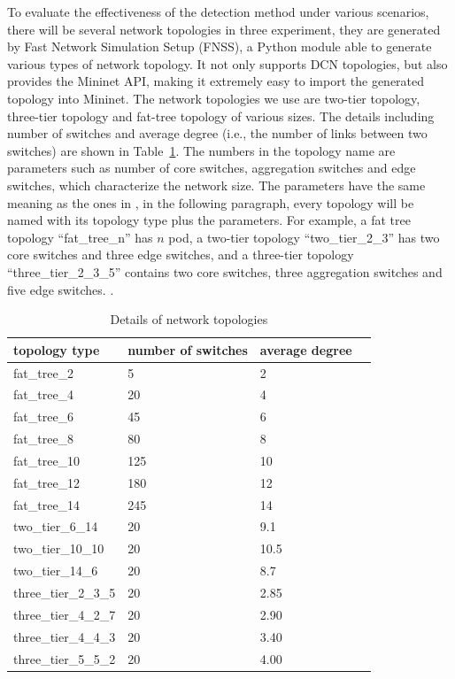 To evaluate the effectiveness of the detection method under various scenarios, there will be several network topologies in three experiment, they are generated by Fast Network Simulation Setup (FNSS), a Python module able to generate various types of network topology. It not only supports DCN topologies, but also provides the Mininet API, making it extremely easy to import the generated topology into Mininet. The network topologies we use are two-tier topology, three-tier topology and fat-tree topology of various sizes. The details including number of switches and average degree (i.e., the number of links between two switches) are shown in Table~\ref{table:network_env}. The numbers in the topology name are parameters such as number of core switches, aggregation switches and edge switches, which characterize the network size. The parameters have the same meaning as the ones in \cite{FNSS}, in the following paragraph, every topology will be named with its topology type plus the parameters. For example, a fat tree topology ``fat\_tree\_n'' has $n$ pod, a two-tier topology ``two\_tier\_2\_3'' has two core switches and three edge switches, and a three-tier topology ``three\_tier\_2\_3\_5'' contains two core switches, three aggregation switches and five edge switches.
\sout{}.

\begin{table}[H]
\centering
\caption{Details of network topologies}
\begin{tabular}{|l|l|l|l|}
\hline topology type & number of switches & average degree \\
\hline
\hline fat\_tree\_2 & 5 & 2 \\
\hline fat\_tree\_4 & 20 & 4 \\
\hline fat\_tree\_6 & 45 & 6 \\
\hline fat\_tree\_8 & 80 & 8 \\
\hline fat\_tree\_10 & 125 & 10 \\
\hline fat\_tree\_12 & 180 & 12 \\
\hline fat\_tree\_14 & 245 & 14 \\
\hline two\_tier\_6\_14 & 20 & 9.1 \\
\hline two\_tier\_10\_10 & 20 & 10.5 \\
\hline two\_tier\_14\_6 & 20 & 8.7 \\
\hline three\_tier\_2\_3\_5 & 20 & 2.85 \\
\hline three\_tier\_4\_2\_7 & 20 & 2.90 \\
\hline three\_tier\_4\_4\_3 & 20 & 3.40 \\
\hline three\_tier\_5\_5\_2 & 20 & 4.00 \\
\hline 
\end{tabular}
\label{table:network_env}
\end{table}

